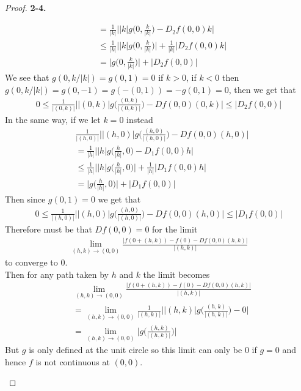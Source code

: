 \documentclass[11pt]{article}
\theoremstyle{definition}
\begin{document}
\begin{proof}{\textbf{2-4.}}
\begin{itemize}
\begin{align*}
    &=\frac{1}{|k|}\bigg|
    |k|g\bigg(0,\frac{k}{|k|}\bigg) - D_2f(0,0)k\bigg|\\
    &\leq \frac{1}{|k|}\bigg|
    |k|g\bigg(0,\frac{k}{|k|}\bigg)\bigg|
    + \frac{1}{|k|}\bigg|D_2f(0,0)k\bigg|\\
    &= \bigg|g\bigg(0,\frac{k}{|k|}\bigg)\bigg|
    + \bigg|D_2f(0,0)\bigg|
\end{align*}
We see that $g(0, k/|k|) = g(0, 1) = 0$ if $k > 0$, if $k < 0$ then
$g(0, k/|k|) = g(0, -1) = g(-(0, 1)) = -g(0,1) = 0$, then we get that
\begin{align*}
    0 \leq \frac{1}{|(0,k)|}\bigg|
    |(0,k)|g\bigg(\frac{(0,k)}{|(0,k)|}\bigg)  - Df(0,0)(0,k)\bigg|
    \leq \bigg|D_2f(0,0)\bigg|
\end{align*}
In the same way, if we let $k = 0$ instead
\begin{align*}
    &\frac{1}{|(h,0)|}\bigg|
    |(h,0)|g\bigg(\frac{(h,0)}{|(h,0)|}\bigg)  - Df(0,0)(h,0)\bigg|\\
    &=\frac{1}{|h|}\bigg|
    |h|g\bigg(\frac{h}{|h|},0\bigg) - D_1f(0,0)h\bigg|\\
    &\leq \frac{1}{|h|}\bigg|
    |h|g\bigg(\frac{h}{|h|},0\bigg)\bigg|
    + \frac{1}{|h|}\bigg|D_1f(0,0)h\bigg|\\
    &= \bigg|g\bigg(\frac{h}{|h|}, 0\bigg)\bigg|
    + \bigg|D_1f(0,0)\bigg|
\end{align*}
Then since $g(0,1) = 0$ we get that
\begin{align*}
    0 \leq \frac{1}{|(h,0)|}\bigg|
    |(h,0)|g\bigg(\frac{(h,0)}{|(h,0)|}\bigg)  - Df(0,0)(h,0)\bigg|
    \leq \bigg|D_1f(0,0)\bigg|
\end{align*}
Therefore must be that $Df(0,0) = 0$ for the limit 
\begin{align*}
    \lim_{(h,k) \to (0,0)} \frac{|f(0 + (h,k)) - f(0) - Df(0,0)(h,k)|}{|(h,k)|}
\end{align*}
to converge to 0.
\\
Then for any path taken by $h$ and $k$ the limit becomes
\begin{align*}
    &\lim_{(h,k) \to (0,0)} \frac{|f(0 + (h,k)) - f(0) - Df(0,0)(h,k)|}{|(h,k)|}\\
    &=\lim_{(h,k) \to (0,0)}
    \frac{1}{|(h,k)|}\bigg|
    |(h,k)|g\bigg(\frac{(h,k)}{|(h,k)|}\bigg)  - 0\bigg|\\
    &=\lim_{(h,k) \to (0,0)}
    \bigg|g\bigg(\frac{(h,k)}{|(h,k)|}\bigg)\bigg|
\end{align*}
But $g$ is only defined at the unit circle so this limit can only be 0 if
$g = 0$ and hence $f$ is not continuous at $(0,0)$.
\end{itemize}
\end{proof}
\end{document}
